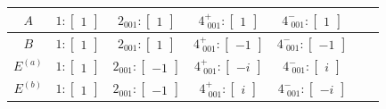 \documentclass[fleqn,8pt,landscape]{jsarticle}
\begin{document}
\begin{longtable}{ccccccc}
$ A $ & $ 1:\begin{bmatrix} 1 \end{bmatrix} $ & $ 2{}_{001}:\begin{bmatrix} 1 \end{bmatrix} $ & $ 4^{+}_{\,\,001}:\begin{bmatrix} 1 \end{bmatrix} $ & $ 4^{-}_{\,\,001}:\begin{bmatrix} 1 \end{bmatrix} $ \\ \hline
$ B $ & $ 1:\begin{bmatrix} 1 \end{bmatrix} $ & $ 2{}_{001}:\begin{bmatrix} 1 \end{bmatrix} $ & $ 4^{+}_{\,\,001}:\begin{bmatrix} -1 \end{bmatrix} $ & $ 4^{-}_{\,\,001}:\begin{bmatrix} -1 \end{bmatrix} $ \\ \hline
$ E^{(a)} $ & $ 1:\begin{bmatrix} 1 \end{bmatrix} $ & $ 2{}_{001}:\begin{bmatrix} -1 \end{bmatrix} $ & $ 4^{+}_{\,\,001}:\begin{bmatrix} - i \end{bmatrix} $ & $ 4^{-}_{\,\,001}:\begin{bmatrix} i \end{bmatrix} $ \\ \hline
$ E^{(b)} $ & $ 1:\begin{bmatrix} 1 \end{bmatrix} $ & $ 2{}_{001}:\begin{bmatrix} -1 \end{bmatrix} $ & $ 4^{+}_{\,\,001}:\begin{bmatrix} i \end{bmatrix} $ & $ 4^{-}_{\,\,001}:\begin{bmatrix} - i \end{bmatrix} $ \\
\end{longtable}
\end{document}
